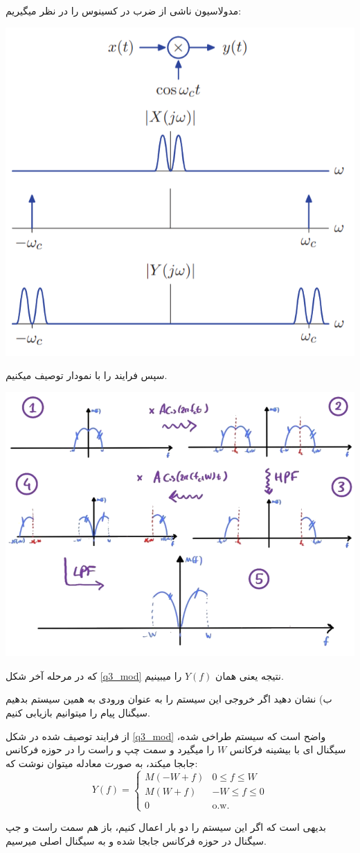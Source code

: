 \begin{qsolve}[]
	مدولاسیون ناشی از ضرب در کسینوس را در نظر میگیریم:

	\begin{center}
		\includegraphics*[width=0.5\linewidth]{pics/cosine_mod.png}
		\label{cosine_mod}
	\end{center}
	سپس فرایند را با نمودار توصیف میکنیم.
	\splitqsolve

	\begin{center}
		\includegraphics*[width=0.9\linewidth]{pics/q3_ans.png}
		\label{q3_mod}
	\end{center}
	که در مرحله آخر شکل \ref*{q3_mod} نتیجه یعنی همان $Y(f)$ را میبینیم.
\end{qsolve}

ب) نشان دهید اگر خروجی این سیستم را به عنوان ورودی به همین سیستم بدهیم سیگنال پیام را میتوانیم بازیابی کنیم.

\begin{qsolve}[]
	از فرایند توصیف شده در شکل \ref*{q3_mod} واضح است که سیستم طراخی شده، سیگنال ای
	با بیشینه فرکانس $W$ را میگیرد و سمت چپ و راست را در حوزه فرکانس جابجا میکند،
	به صورت معادله میتوان نوشت که:
	\[
		Y(f)=\begin{cases}
			M(-W+f) & 0\leq f \leq W   \\
			M(W+f)  & -W \leq f \leq 0 \\
			0       & \text{o.w.}
		\end{cases}
	\]

    بدیهی است که اگر این سیستم را دو بار اعمال کنیم، باز هم سمت راست و جپ سیگنال 
    در حوزه فرکانس جابجا شده و به سیگنال اصلی میرسیم.
\end{qsolve}
